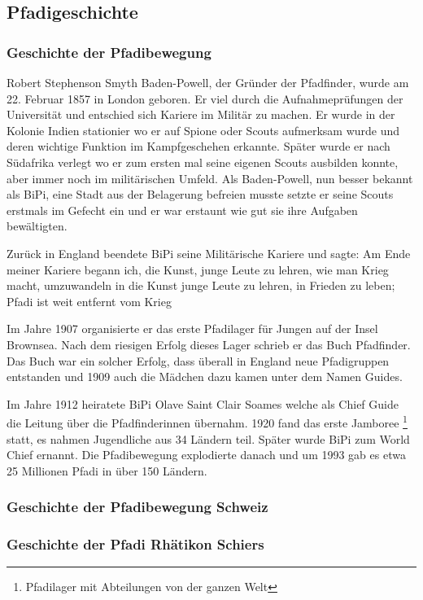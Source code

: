 \subsection*{Pfadigeschichte}
\subsubsection{Geschichte der Pfadibewegung}
Robert Stephenson Smyth Baden-Powell, der Gründer der Pfadfinder, wurde am 22. Februar 1857 in London geboren. Er viel durch die Aufnahmeprüfungen der Universität und entschied sich Kariere im Militär zu machen. Er wurde in der Kolonie Indien stationier wo er auf Spione oder Scouts aufmerksam wurde und deren wichtige Funktion im Kampfgeschehen erkannte. Später wurde er nach Südafrika verlegt wo er zum ersten mal seine eigenen Scouts ausbilden konnte, aber immer noch im militärischen Umfeld. Als Baden-Powell, nun besser bekannt als BiPi, eine Stadt aus der Belagerung befreien musste setzte er seine Scouts erstmals im Gefecht ein und er war erstaunt wie gut sie ihre Aufgaben bewältigten. \par Zurück in England beendete BiPi seine Militärische Kariere und sagte: \glqq Am Ende meiner Kariere begann ich, die Kunst, junge Leute zu lehren, wie man Krieg macht, umzuwandeln in die Kunst junge Leute zu lehren, in Frieden zu leben; Pfadi ist weit entfernt vom Krieg\grqq \par
Im Jahre 1907 organisierte er das erste Pfadilager für Jungen auf der Insel Brownsea. Nach dem riesigen Erfolg dieses Lager schrieb er das Buch Pfadfinder. Das Buch war ein solcher Erfolg, dass überall in England neue Pfadigruppen entstanden und 1909 auch die Mädchen dazu kamen unter dem Namen Guides. \par Im Jahre 1912 heiratete BiPi Olave Saint Clair Soames welche als Chief Guide die Leitung über die Pfadfinderinnen übernahm. 1920 fand das erste Jamboree \footnote{Pfadilager mit Abteilungen von der ganzen Welt} statt, es nahmen Jugendliche aus 34 Ländern teil. Später wurde BiPi zum World Chief ernannt. Die Pfadibewegung explodierte danach und um 1993 gab es etwa 25 Millionen Pfadi in über 150 Ländern. \par 
\subsubsection{Geschichte der Pfadibewegung Schweiz}
\subsubsection{Geschichte der Pfadi Rhätikon Schiers}